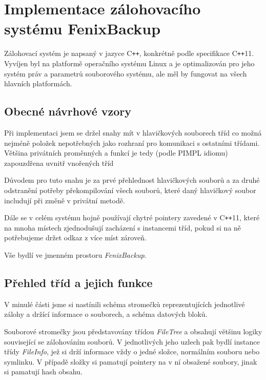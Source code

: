 \chapter{Implementace zálohovacího systému FenixBackup}

Zálohovací systém je napsaný v jazyce C{\tt++}, konkrétně podle specifikace
C{\tt++}11. Vyvíjen byl na platformě operačního systému Linux a je optimalizován
pro jeho systém práv a parametrů souborového systému, ale měl by fungovat na
všech hlavních platformách.

\section{Obecné návrhové vzory}


Při implementaci jsem se držel snahy mít v hlavičkových souborech tříd co možná
nejméně položek nepotřebných jako rozhraní pro komunikaci s ostatními třídami.
Většina privátních proměnných a funkcí je tedy (podle \gls{PIMPL} idiomu)
zapouzdřena uvnitř vnořených tříd

Důvodem pro tuto snahu je za prvé přehlednost hlavičkových souborů a za druhé
odstranění potřeby překompilování všech souborů, které daný hlavičkový soubor
includují při změně v privátní metodě.

Dále se v celém systému hojně používají chytré pointery zavedené v C{\tt ++}11,
které na mnoha místech zjednodušují zacházení s instancemi tříd, pokud si na ně
potřebujeme držet odkaz z více míst zároveň.

Vše bydlí ve jmenném prostoru {\it FenixBackup}.

\section{Přehled tříd a jejich funkce}

V minulé části jsme si nastínili schéma stromečků reprezentujících jednotlivé
zálohy a držící informace o souborech, a schéma datových bloků.

Souborové stromečky jsou představovány třídou {\it FileTree} a obsahují většinu
logiky související se zálohováním souborů. V jednotlivých jeho uzlech pak bydlí
instance třídy {\it FileInfo}, jež si drží informace vždy o jedné složce,
normálním souboru nebo symlinku. V případě složky si pamatují pointery na v ní
obsažené soubory, jinak si pamatují hash obsahu.

